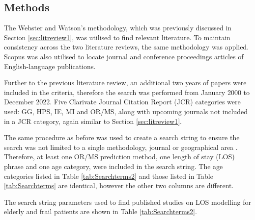 \documentclass[../thesis.tex]{subfiles}
\begin{document}
\subsection{Methods}\label{sec:lt2Methods}
The Webster and Watson's \cite{Webster} methodology, which was previously discussed in Section \ref{sec:litreview1}, was utilised to find relevant literature. To maintain consistency across the two literature reviews, the same methodology was applied. Scopus was also utilised to locate journal and conference proceedings articles of English-language publications.

Further to the previous literature review, an additional two years of papers were included in the criteria, therefore the search was performed from January 2000 to December 2022. Five Clarivate Journal Citation Report (JCR) categories were used: GG, HPS, IE, MI and OR/MS, along with upcoming journals not included in a JCR category, again similar to Section \ref{sec:litreview1}.

The same procedure as before was used to create a search string to ensure the search was not limited to a single methodology, journal or geographical area \cite{Webster}. Therefore, at least one OR/MS prediction method, one length of stay (LOS) phrase and one age category, were included in the search string. The age categories listed in Table \ref{tab:Searchterms2} and those listed in Table \ref{tab:Searchterms} are identical, however the other two columns are different. 

The search string parameters used to find published studies on LOS modelling for elderly and frail patients are shown in Table \ref{tab:Searchterms2}. 
%

\begin{table}[h!]
\centering

\caption{Final terms for hierarchical prediction literature search}
\label{tab:Searchterms2}
\end{table}
\end{document}
